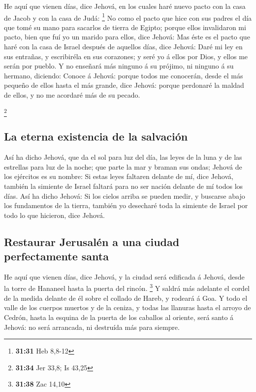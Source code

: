  He aquí que vienen días, dice Jehová, en los cuales haré
nuevo pacto con la casa de Jacob y con la casa de Judá: \footnote{\textbf{31:31}
  Heb 8,8-12}  No como el pacto que hice con sus padres el
día que tomé su mano para sacarlos de tierra de Egipto; porque ellos
invalidaron mi pacto, bien que fuí yo un marido para ellos, dice Jehová:
 Mas éste es el pacto que haré con la casa de Israel
después de aquellos días, dice Jehová: Daré mi ley en sus entrañas, y
escribiréla en sus corazones; y seré yo á ellos por Dios, y ellos me
serán por pueblo.  Y no enseñará más ninguno á su prójimo,
ni ninguno á su hermano, diciendo: Conoce á Jehová: porque todos me
conocerán, desde el más pequeño de ellos hasta el más grande, dice
Jehová: porque perdonaré la maldad de ellos, y no me acordaré más de su
pecado.

\footnote{\textbf{31:34} Jer 33,8; Is 43,25}

\hypertarget{la-eterna-existencia-de-la-salvaciuxf3n}{%
\subsection{La eterna existencia de la
salvación}\label{la-eterna-existencia-de-la-salvaciuxf3n}}

 Así ha dicho Jehová, que da el sol para luz del día, las
leyes de la luna y de las estrellas para luz de la noche; que parte la
mar y braman sus ondas; Jehová de los ejércitos es su nombre:
 Si estas leyes faltaren delante de mí, dice Jehová,
también la simiente de Israel faltará para no ser nación delante de mí
todos los días.  Así ha dicho Jehová: Si los cielos arriba
se pueden medir, y buscarse abajo los fundamentos de la tierra, también
yo desecharé toda la simiente de Israel por todo lo que hicieron, dice
Jehová.

\hypertarget{restaurar-jerusaluxe9n-a-una-ciudad-perfectamente-santa}{%
\subsection{Restaurar Jerusalén a una ciudad perfectamente
santa}\label{restaurar-jerusaluxe9n-a-una-ciudad-perfectamente-santa}}

 He aquí que vienen días, dice Jehová, y la ciudad será
edificada á Jehová, desde la torre de Hananeel hasta la puerta del
rincón. \footnote{\textbf{31:38} Zac 14,10}  Y saldrá más
adelante el cordel de la medida delante de él sobre el collado de Hareb,
y rodeará á Goa.  Y todo el valle de los cuerpos muertos y
de la ceniza, y todas las llanuras hasta el arroyo de Cedrón, hasta la
esquina de la puerta de los caballos al oriente, será santo á Jehová: no
será arrancada, ni destruída más para siempre.

